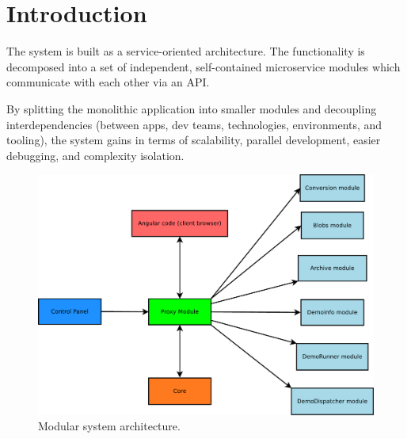 \section{Introduction}

The system is built as a service-oriented architecture.
The functionality is decomposed into a set of independent, self-contained microservice modules which communicate with each other via an API.

By splitting the monolithic application into smaller modules and decoupling interdependencies (between apps, dev teams, technologies, environments, and tooling), the system gains in terms of scalability, parallel development, easier debugging, and complexity isolation.

\begin{figure}[!ht]
\centering
\includegraphics[width=0.8\linewidth]{architecture/images/architecture.pdf}
\caption{Modular system architecture.} 
\label{fig:architecture}
\end{figure}
